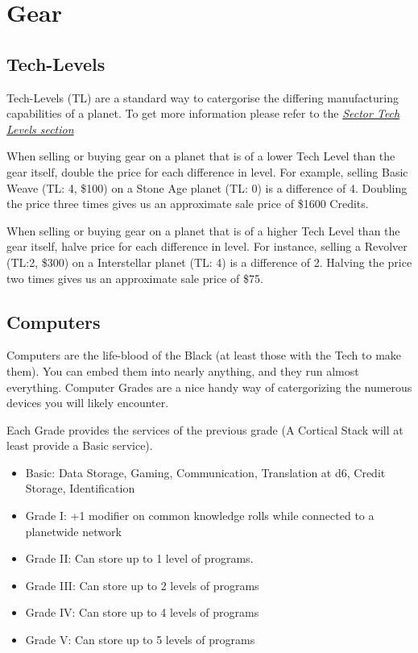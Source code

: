 
\section{Gear}
\label{sec:gear}

\begin{multicols}{2}
\subsection{Tech-Levels}
\label{sec:gear-tech}
  
Tech-Levels (TL) are a standard way to catergorise the differing manufacturing capabilities of a planet. To get more information please refer to the \textit{\hyperref[sec:sector-tech-levels]{Sector Tech Levels section}}

When selling or buying gear on a planet that is of a lower Tech Level than the gear itself, double the price for each difference in level. For example, selling Basic Weave (TL: 4, \$100) on a Stone Age planet (TL: 0) is a difference of 4. Doubling the price three times gives us an approximate sale price of \$1600 Credits.

When selling or buying gear on a planet that is of a higher Tech Level than the gear itself, halve price for each difference in level. For instance, selling a Revolver (TL:2, \$300) on a Interstellar planet (TL: 4) is a difference of 2. Halving the price two times gives us an approximate sale price of \$75.

\subsection{Computers}
\label{sec:gear-computers}

Computers are the life-blood of the Black (at least those with the Tech to make them). You can embed them into nearly anything, and they run almost everything. Computer Grades are a nice handy way of catergorizing the numerous devices you will likely encounter.

Each Grade provides the services of the previous grade (A Cortical Stack will at least provide a Basic service).

\begin{itemize}
  \item Basic: Data Storage, Gaming, Communication, Translation at d6, Credit Storage, Identification
  \item Grade I: +1 modifier on common knowledge rolls while connected to a planetwide network
  \item Grade II: Can store up to 1 level of programs.
  \item Grade III: Can store up to 2 levels of programs
  \item Grade IV:  Can store up to 4 levels of programs
  \item Grade V: Can store up to 5 levels of programs
\end{itemize}


\end{multicols}
